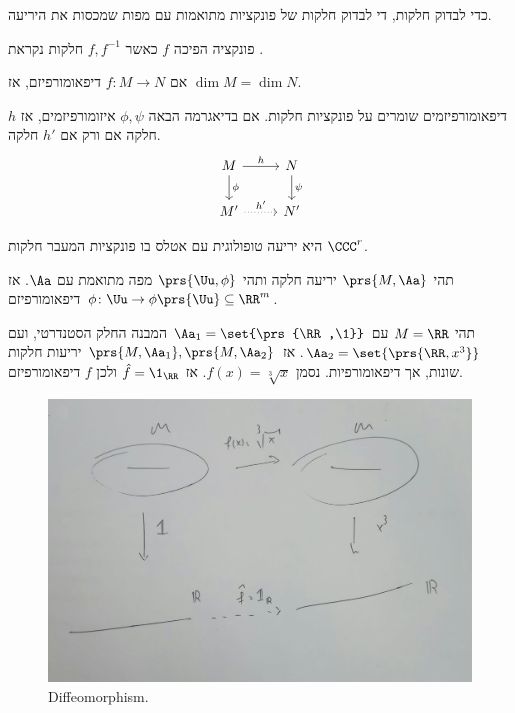 \documentclass[a4paper,10pt,twoside,openany]{book}
\begin{document}
\begin{remark}
כדי לבדוק חלקות, די לבדוק חלקות של פונקציות מתואמות עם מפות שמכסות את היריעה.
\end{remark}
\begin{definition}
פונקציה הפיכה
$f$
כאשר
$f,f^{-1}$
חלקות נקראת
.
\end{definition}
\begin{exercise}
אם
$f \colon M \to N$
דיפאומורפיזם, אז
$\dim M = \dim N$.
\end{exercise}
\begin{exercise}
דיפאומורפיזמים שומרים על פונקציות חלקות.
אם בדיאגרמה הבאה
$\phi,\psi$
איזומורפיזמים, אז
$h$
חלקה אם ורק אם
$h'$
חלקה.
\[
\begin{tikzcd}
M \arrow[r,"h"] \arrow[d,"\phi"] & N \arrow[d,"\psi"] \\
M' \arrow[r, dotted, "h'"] & N'
\end{tikzcd}
\]
\end{exercise}
\begin{definition}
היא יריעה טופולוגית עם אטלס בו פונקציות המעבר חלקות
$\CCC^r$.
\end{definition}
\begin{exercise}
תהי
$\prs{M,\Aa}$
יריעה חלקה ותהי
$\prs{\Uu, \phi}$
מפה מתואמת עם
$\Aa$.
אז
$\phi \colon \Uu \to \phi\prs{\Uu} \subseteq \RR^m$
דיפאומורפיזם.
\end{exercise}
\begin{example}
תהי
$M = \RR$
עם
$\Aa_1 = \set{\prs{\RR,\1}}$
המבנה החלק הסטנדרטי, ועם
$\Aa_2 = \set{\prs{\RR,x^3}}$.
אז
$\prs{M,\Aa_1}, \prs{M,\Aa_2}$
יריעות חלקות שונות, אך דיפאומורפיות.
נסמן
$f(x) = \sqrt[3]{x}$.
אז
$\hat{f} = \1_{\RR}$
ולכן
$f$
דיפאומורפיזם.
\begin{figure}[h!]
\centering
\caption{Diffeomorphism.}
\label{diffeo}
\includegraphics[scale=0.6]{sources/diffeo}
\end{figure}
\end{example}
\end{document}
